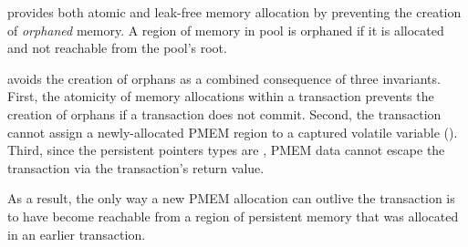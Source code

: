 \This{} provides both atomic and leak-free memory allocation by preventing the
creation of \emph{orphaned} memory.  A region of memory in pool  is
orphaned if it is allocated and not reachable from the pool's root.

\This{} avoids the creation of orphans as a combined consequence of three
invariants.  First, the atomicity of memory allocations within a transaction prevents the creation of
orphans if a transaction does not commit.  Second, the transaction cannot
assign a newly-allocated PMEM region to a captured volatile variable
().  Third, since the persistent pointers types
are , PMEM data cannot escape the transaction via the
transaction's return value.

As a result, the only way a new PMEM allocation can outlive the transaction is
to have become reachable from a region of persistent memory that was allocated
in an earlier transaction.


